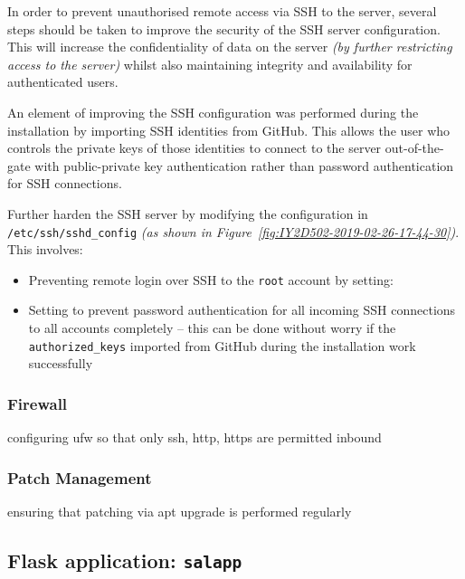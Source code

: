 In order to prevent unauthorised remote access via SSH to the server, several steps should be taken to improve the security of the SSH server configuration. This will increase the confidentiality of data on the server \textit{(by further restricting access to the server)} whilst also maintaining integrity and availability for authenticated users.

An element of improving the SSH configuration was performed during the installation by importing SSH identities from GitHub. This allows the user who controls the private keys of those identities to connect to the server out-of-the-gate with public-private key authentication rather than password authentication for SSH connections.

Further harden the SSH server by modifying the configuration in \texttt{/etc/ssh/sshd\_config} \textit{(as shown in Figure~\ref{fig:IY2D502-2019-02-26-17-44-30})}. This involves:
\begin{itemize}
  \item Preventing remote login over SSH to the \texttt{root} account by setting:\\
  \item Setting  to prevent password authentication for all incoming SSH connections to all accounts completely -- this can be done without worry if the \texttt{authorized\_keys} imported from GitHub during the installation work successfully
\end{itemize}

\subsubsection{Firewall}
configuring ufw so that only ssh, http, https are permitted inbound
\subsubsection{Patch Management}
ensuring that patching via apt upgrade is performed regularly


\pagebreak
\subsection{Flask application: \texttt{salapp}}

